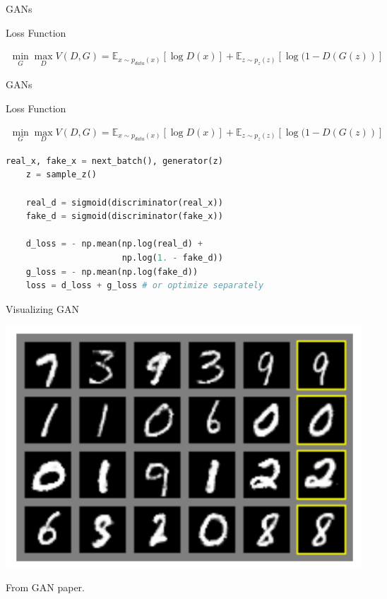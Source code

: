 \documentclass{beamer}
\begin{document}
\begin{frame}[fragile]{GANs}{}

    Loss Function
    
    \begin{align*}
        \min_G \max_D V(D,G) = 
        \mathbb{E}_{x \sim p_{data}(x)} [ \log D(x) ] +
        \mathbb{E}_{z \sim p_z(z)} [ \log (1-D(G(z)) ]
    \end{align*}
  
\end{frame}

\begin{frame}[fragile]{GANs}{}

    Loss Function
    
    \begin{align*}
        \min_G \max_D V(D,G) = 
        \mathbb{E}_{x \sim p_{data}(x)} [ \log D(x) ] +
        \mathbb{E}_{z \sim p_z(z)} [ \log (1-D(G(z)) ]
    \end{align*}

\begin{center}
    \begin{lstlisting}[language=Python]
    real_x, fake_x = next_batch(), generator(z)
    z = sample_z()
    
    real_d = sigmoid(discriminator(real_x))
    fake_d = sigmoid(discriminator(fake_x))
    
    d_loss = - np.mean(np.log(real_d) + 
                       np.log(1. - fake_d))
    g_loss = - np.mean(np.log(fake_d))
    loss = d_loss + g_loss # or optimize separately
    \end{lstlisting}
\end{center}
  
\end{frame}

\begin{frame}{Visualizing GAN}{}

  \begin{center}
    \includegraphics[height=0.6\textheight]{gan_neighbors}
  \end{center}
  
  From GAN paper.

\end{frame}
\end{document}
